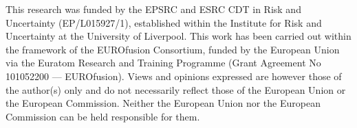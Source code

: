 \documentclass[twocolumn]{rps-esrel2022}
\begin{document}
\begin{acknowledgement}
	This research was funded by the EPSRC and ESRC CDT in Risk and Uncertainty (EP/L015927/1), established within
	the Institute for Risk and Uncertainty at the University of Liverpool.
	This work has been carried out within the framework of the EUROfusion Consortium, funded by the European Union
	via the Euratom Research and Training Programme (Grant Agreement No 101052200 — EUROfusion). Views and opinions
	expressed are however those of the author(s) only and do not necessarily reflect those of the European Union or
	the European Commission. Neither the European Union nor the European Commission can be held responsible for them.



\end{acknowledgement}
\end{document}
